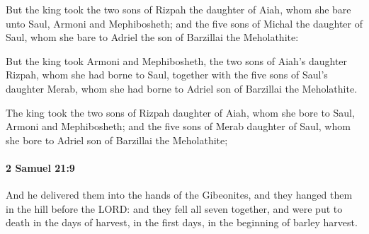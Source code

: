 			\begin{versebox}
					\item[BHS] 
					\item[ASV] But the king took the two sons of Rizpah the daughter of Aiah, whom she bare unto Saul, Armoni and Mephibosheth; and the five sons of Michal the daughter of Saul, whom she bare to Adriel the son of Barzillai the Meholathite:
					\item[NIV] But the king took Armoni and Mephibosheth, the two sons of Aiah’s daughter Rizpah, whom she had borne to Saul, together with the five sons of Saul’s daughter Merab, whom she had borne to Adriel son of Barzillai the Meholathite.
					\item[NRSV] The king took the two sons of Rizpah daughter of Aiah, whom she bore to Saul, Armoni and Mephibosheth; and the five sons of Merab daughter of Saul, whom she bore to Adriel son of Barzillai the Meholathite;
			\end{versebox}

		\paragraph{2 Samuel 21:9} %
			\label{2SAMUEL-21-9}

			And he delivered them into the hands of the Gibeonites, and they hanged them in the hill before the LORD: and they fell all seven together, and were put to death in the days of harvest, in the first days, in the beginning of barley harvest.

